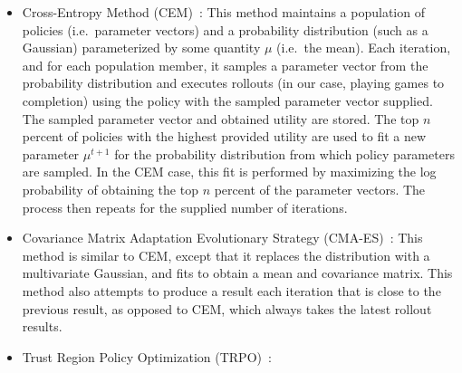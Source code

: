 \begin{itemize}
    \item Cross-Entropy Method (CEM)~\cite{rubinstein2013cross,
        policyoptimizationNIPS2016}: This method maintains a population of
        policies (i.e.\ parameter vectors) and a probability distribution (such
        as a Gaussian) parameterized by some quantity $\mu$ (i.e.\ the mean).
        Each iteration, and for each population member, it samples a parameter
        vector from the probability distribution and executes rollouts (in our
        case, playing games to completion) using the policy with the sampled
        parameter vector supplied. The sampled parameter vector and obtained
        utility are stored.  The top $n$ percent of policies with the highest
        provided utility are used to fit a new parameter $\mu^{t+1}$ for the
        probability distribution from which policy parameters are sampled. In
        the CEM case, this fit is performed by maximizing the log probability
        of obtaining the top $n$ percent of the parameter vectors. The process
        then repeats for the supplied number of iterations.

    \item Covariance Matrix Adaptation Evolutionary Strategy
        (CMA-ES)~\cite{cmaes, policyoptimizationNIPS2016}: This method is
        similar to CEM, except that it replaces the distribution with
        a multivariate Gaussian, and fits to obtain a mean and covariance matrix.
        This method also attempts to produce a result each iteration that is
        close to the previous result, as opposed to CEM, which always takes the
        latest rollout results.

    \item Trust Region Policy Optimization (TRPO)~\cite{TRPO,
        policyoptimizationNIPS2016}:
\end{itemize}
